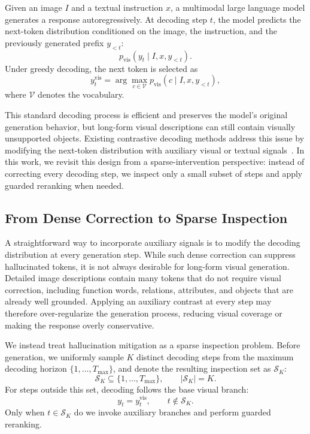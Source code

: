 \documentclass[11pt]{article}
\begin{document}
  Given an image $I$ and a textual instruction $x$, a multimodal large language model generates a response autoregressively. At decoding step $t$, the model predicts the next-token distribution conditioned on the
  image, the instruction, and the previously generated prefix $y_{<t}$:
  \begin{equation}
  p_{\mathrm{vis}}(y_t \mid I, x, y_{<t}).
  \end{equation}
  Under greedy decoding, the next token is selected as
  \begin{equation}
  y_t^{\mathrm{vis}}
  =
  \arg\max_{c \in \mathcal{V}}
  p_{\mathrm{vis}}(c \mid I, x, y_{<t}),
  \end{equation}
  where $\mathcal{V}$ denotes the vocabulary.

  This standard decoding process is efficient and preserves the model's original generation behavior, but long-form visual descriptions can still contain visually unsupported objects. Existing contrastive decoding
  methods address this issue by modifying the next-token distribution with auxiliary visual or textual signals~\citep{Leng_2024_CVPR,manevich-tsarfaty-2024-lcd,wang-etal-2024-mitigating}. In this work, we revisit this design from a sparse-intervention perspective: instead of correcting every
  decoding step, we inspect only a small subset of steps and apply guarded reranking when needed.

\subsection{From Dense Correction to Sparse Inspection}

  A straightforward way to incorporate auxiliary signals is to modify the decoding distribution at every generation step. While such dense correction can suppress hallucinated tokens, it is not always desirable for
  long-form visual generation. Detailed image descriptions contain many tokens that do not require visual correction, including function words, relations, attributes, and objects that are already well grounded.
  Applying an auxiliary contrast at every step may therefore over-regularize the generation process, reducing visual coverage or making the response overly conservative.

  We instead treat hallucination mitigation as a sparse inspection problem. Before generation, we uniformly sample $K$ distinct decoding steps from the maximum decoding horizon $\{1,\ldots,T_{\max}\}$, and denote the
  resulting inspection set as $\mathcal{S}_K$:
  \begin{equation}
  \mathcal{S}_K \subseteq \{1,\ldots,T_{\max}\},
  \qquad
  |\mathcal{S}_K| = K .
  \end{equation}
  For steps outside this set, decoding follows the base visual branch:
  \begin{equation}
  y_t = y_t^{\mathrm{vis}}, \qquad t \notin \mathcal{S}_K .
  \end{equation}
  Only when $t \in \mathcal{S}_K$ do we invoke auxiliary branches and perform guarded reranking.
\end{document}
